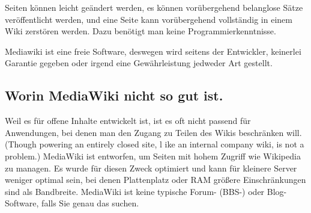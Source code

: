 Seiten können leicht geändert werden, es können vorübergehend belanglose Sätze veröffentlicht werden, und eine Seite kann vorübergehend vollständig in einem Wiki zerstören werden. Dazu benötigt man keine Programmierkenntnisse.

Mediawiki ist eine freie Software, deswegen wird seitens der Entwickler, keinerlei Garantie gegeben oder irgend eine Gewährleistung jedweder Art gestellt.


\subsection{Worin MediaWiki nicht so gut ist.}
Weil es für offene Inhalte entwickelt ist, ist es oft nicht passend für Anwendungen, bei denen man den Zugang zu Teilen des Wikis beschränken will. (Though powering an entirely closed site, l	ike an internal company wiki, is not a problem.) 
MediaWiki ist entworfen, um Seiten mit hohem Zugriff wie Wikipedia zu managen. Es wurde für diesen Zweck optimiert und kann für kleinere Server weniger optimal sein, bei denen Plattenplatz oder RAM größere Einschränkungen sind als Bandbreite. 
MediaWiki ist keine typische Forum- (BBS-) oder Blog-Software, falls Sie genau das suchen. 

